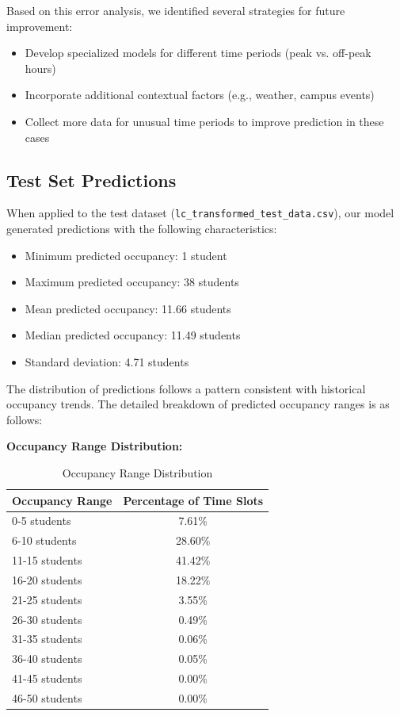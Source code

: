 \documentclass[12pt,letterpaper]{article}
\begin{document}
Based on this error analysis, we identified several strategies for future improvement:
\begin{itemize}
    \item Develop specialized models for different time periods (peak vs. off-peak hours)
    \item Incorporate additional contextual factors (e.g., weather, campus events)
    \item Collect more data for unusual time periods to improve prediction in these cases
\end{itemize}

\subsection{Test Set Predictions}

When applied to the test dataset (\texttt{lc\_transformed\_test\_data.csv}), our model generated predictions with the following characteristics:

\begin{itemize}
    \item Minimum predicted occupancy: 1 student
    \item Maximum predicted occupancy: 38 students
    \item Mean predicted occupancy: 11.66 students
    \item Median predicted occupancy: 11.49 students
    \item Standard deviation: 4.71 students
\end{itemize}

The distribution of predictions follows a pattern consistent with historical occupancy trends. The detailed breakdown of predicted occupancy ranges is as follows:

\textbf{Occupancy Range Distribution:}
\begin{table}[H]
\centering
\begin{tabular}{lc}
\toprule
\textbf{Occupancy Range} & \textbf{Percentage of Time Slots} \\
\midrule
0-5 students    & 7.61\% \\
6-10 students   & 28.60\% \\
11-15 students  & 41.42\% \\
16-20 students  & 18.22\% \\
21-25 students  & 3.55\% \\
26-30 students  & 0.49\% \\
31-35 students  & 0.06\% \\
36-40 students  & 0.05\% \\
41-45 students  & 0.00\% \\
46-50 students  & 0.00\% \\
\bottomrule
\end{tabular}
\caption{Occupancy Range Distribution}
\end{table}
\end{document}
